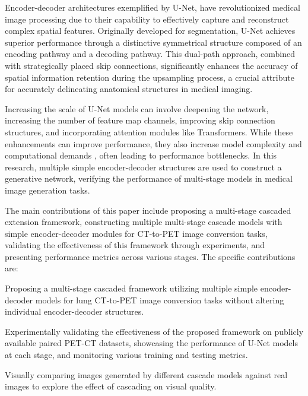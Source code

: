 \documentclass[a4paper, times, 10pt,twocolumn]{article}
\begin{document}
Encoder-decoder architectures exemplified by U-Net, have revolutionized medical image processing due to their capability to effectively capture and reconstruct complex spatial features. Originally developed for segmentation, U-Net\cite{navab_u-net_2015} achieves superior performance through a distinctive symmetrical structure composed of an encoding pathway and a decoding pathway. This dual-path approach, combined with strategically placed skip connections\cite{he_deep_2016}, significantly enhances the accuracy of spatial information retention during the upsampling process, a crucial attribute for accurately delineating anatomical structures in medical imaging.

Increasing the scale of U-Net models can involve deepening the network, increasing the number of feature map channels, improving skip connection structures, and incorporating attention modules like Transformers\cite{vaswani_attention_2017}. While these enhancements can improve performance, they also increase model complexity and computational demands \cite{tan_efficientnet_2019}, often leading to performance bottlenecks. In this research, multiple simple encoder-decoder structures are used to construct a generative network, verifying the performance of multi-stage models in medical image generation tasks.

The main contributions of this paper include proposing a multi-stage cascaded extension framework, constructing multiple multi-stage cascade models with simple encoder-decoder modules for CT-to-PET image conversion tasks, validating the effectiveness of this framework through experiments, and presenting performance metrics across various stages. The specific contributions are:

Proposing a multi-stage cascaded framework utilizing multiple simple encoder-decoder models for lung CT-to-PET image conversion tasks without altering individual encoder-decoder structures.

Experimentally validating the effectiveness of the proposed framework on publicly available paired PET-CT datasets, showcasing the performance of U-Net models at each stage, and monitoring various training and testing metrics.

Visually comparing images generated by different cascade models against real images to explore the effect of cascading on visual quality.
\end{document}
